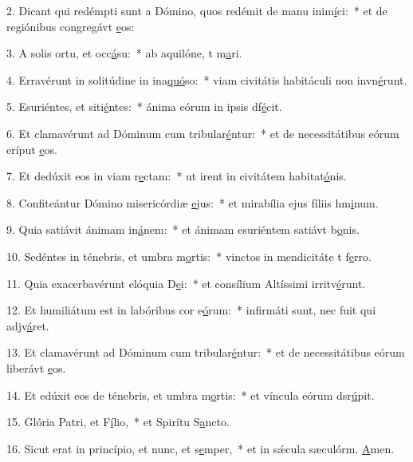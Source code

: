 2. Dicant qui redémpti sunt a Dómino, quos redémit de manu inim\uline{í}ci:~* et de regiónibus congregávt \uline{e}os:\par 
3. A solis ortu, et occ\uline{á}su:~* ab aquilóne, t m\uline{a}ri.\par 
4. Erravérunt in solitúdine in ina\uline{quó}so:~* viam civitátis habitáculi non invn\uline{é}runt.\par 
5. Esuriéntes, et siti\uline{é}ntes:~* ánima eórum in ipsis df\uline{é}cit.\par 
6. Et clamavérunt ad Dóminum cum tribular\uline{é}ntur:~* et de necessitátibus eórum eríput \uline{e}os.\par 
7. Et dedúxit eos in viam r\uline{e}ctam:~* ut irent in civitátem habitat\uline{ó}nis.\par 
8. Confiteántur Dómino misericórdiæ \uline{e}jus:~* et mirabília ejus fíliis hm\uline{i}num.\par 
9. Quia satiávit ánimam in\uline{á}nem:~* et ánimam esuriéntem satiávt b\uline{o}nis.\par 
10. Sedéntes in ténebris, et umbra m\uline{o}rtis:~* vinctos in mendicitáte t f\uline{e}rro.\par 
11. Quia exacerbavérunt elóquia D\uline{e}i:~* et consílium Altíssimi irritv\uline{é}runt.\par 
12. Et humiliátum est in labóribus cor e\uline{ó}rum:~* infirmáti sunt, nec fuit qui adjv\uline{á}ret.\par 
13. Et clamavérunt ad Dóminum cum tribular\uline{é}ntur:~* et de necessitátibus eórum liberávt \uline{e}os.\par 
14. Et edúxit eos de ténebris, et umbra m\uline{o}rtis:~* et víncula eórum dsr\uline{ú}pit.\par 
15. Glória Patri, et F\uline{í}lio,~* et Spirítu S\uline{a}ncto.\par 
16. Sicut erat in princípio, et nunc, et s\uline{e}mper,~* et in sǽcula sæculórm. \uline{A}men.\par 
